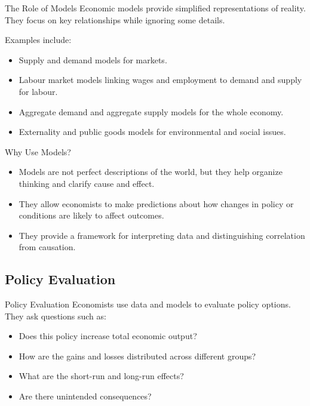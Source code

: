 \documentclass[aspectratio=169]{beamer}
\begin{document}
\begin{frame}{The Role of Models}
  \transfade
  Economic models provide simplified representations of reality. They focus on key relationships
  while ignoring some details.

  \vspace{0.2cm}
  Examples include:
  \begin{itemize}
    \item Supply and demand models for markets.
    \item Labour market models linking wages and employment to demand and supply for labour.
    \item Aggregate demand and aggregate supply models for the whole economy.
    \item Externality and public goods models for environmental and social issues.
  \end{itemize}
\end{frame}

\begin{frame}{Why Use Models?}
  \transfade
  \begin{itemize}
    \item Models are not perfect descriptions of the world, but they help organize thinking and
    clarify cause and effect.
    \item They allow economists to make predictions about how changes in policy or conditions
    are likely to affect outcomes.
    \item They provide a framework for interpreting data and distinguishing correlation from causation.
  \end{itemize}
\end{frame}

\subsection{Policy Evaluation}

\begin{frame}{Policy Evaluation}
  \transfade
  Economists use data and models to evaluate policy options. They ask questions such as:
  \begin{itemize}
    \item Does this policy increase total economic output?
    \item How are the gains and losses distributed across different groups?
    \item What are the short-run and long-run effects?
    \item Are there unintended consequences?
  \end{itemize}
\end{frame}
\end{document}
